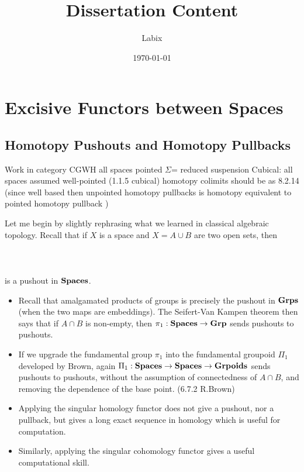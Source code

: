\documentclass[a4paper]{article}
\title{Dissertation Content}
\author{Labix}
\date{\today}
\begin{document}
\maketitle
\begin{abstract}
\end{abstract}

\pagebreak
\tableofcontents

\pagebreak
\section{Excisive Functors between Spaces}
\subsection{Homotopy Pushouts and Homotopy Pullbacks}
Work in category CGWH
all spaces pointed
$\Sigma$= reduced suspension
Cubical: all spaces assumed well-pointed (1.1.5 cubical)
homotopy colimits should be as 8.2.14 (since well based then unpointed homotopy pullbacks is homotopy equivalent to pointed homotopy pullback )

Let me begin by slightly rephrasing what we learned in classical algebraic topology. Recall that if $X$ is a space and $X=A\cup B$ are two open sets, then \\~\\
\\~\\
is a pushout in $\bold{Spaces}$. 
\begin{itemize}
\item Recall that amalgamated products of groups is precisely the pushout in $\bold{Grps}$ (when the two maps are embeddings). The Seifert-Van Kampen theorem then says that if $A\cap B$ is non-empty, then $\pi_1:\bold{Spaces}\to\bold{Grp}$ sends pushouts to pushouts. 
\item If we upgrade the fundamental group $\pi_1$ into the fundamental groupoid $\Pi_1$ developed by Brown, again $\Pi_1:\bold{Spaces}\to\bold{Spaces}\to\bold{Grpoids}$ sends pushouts to pushouts, without the assumption of connectedness of $A\cap B$, and removing the dependence of the base point. (6.7.2 R.Brown)
\item Applying the singular homology functor does not give a pushout, nor a pullback, but gives a long exact sequence in homology which is useful for computation. 
\item Similarly, applying the singular cohomology functor gives a useful computational skill. 
\end{itemize}
\end{document}
